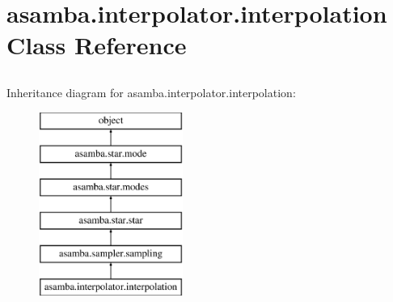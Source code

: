 \hypertarget{classasamba_1_1interpolator_1_1interpolation}{}\section{asamba.\+interpolator.\+interpolation Class Reference}
\label{classasamba_1_1interpolator_1_1interpolation}


\paragraph*{}

\subsection*{}

\subsection*{}

\subsection*{}

\subsection*{}

\subsection*{}

\subparagraph*{} 


Inheritance diagram for asamba.\+interpolator.\+interpolation\+:\begin{figure}[H]
\begin{center}
\leavevmode
\includegraphics[height=6.000000cm]{classasamba_1_1interpolator_1_1interpolation}
\end{center}
\end{figure}
